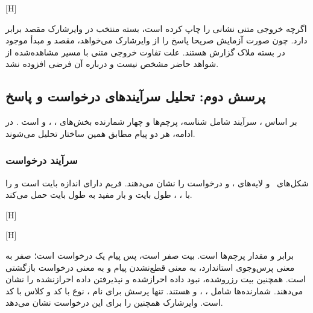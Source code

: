 [H]

اگرچه خروجی متنی  نشانی  را چاپ کرده است، بسته منتخب در وایرشارک
مقصد  برابر  دارد. چون صورت آزمایش صریحا پاسخ را از
وایرشارک می‌خواهد، مقصد و مبدأ موجود در بسته ملاک گزارش هستند. علت تفاوت خروجی متنی با مسیر
مشاهده‌شده از شواهد حاضر مشخص نیست و درباره آن فرضی افزوده نشد.

\subsection{پرسش دوم: تحلیل سرآیندهای درخواست و پاسخ }

بر اساس ، سرآیند  شامل شناسه، پرچم‌ها و چهار شمارنده
بخش‌های ، ،  و  است .
در ادامه، هر دو پیام مطابق همین ساختار تحلیل می‌شوند.

\subsubsection{سرآیند درخواست}

شکل‌های~ و
 لایه‌های ،  و  درخواست را
نشان می‌دهند. فریم  دارای اندازه  بایت است و  را با
، ، طول  بایت و بار مفید  به طول  بایت
حمل می‌کند.

[H]

[H]

 برابر  و مقدار پرچم‌ها  است. بیت  صفر است، پس پیام
یک درخواست است؛  صفر به معنی پرس‌وجوی استاندارد،  به معنی قطع‌نشدن
پیام و  به معنی درخواست بازگشتی است. همچنین 
بیت رزروشده،  نبود داده احرازشده و  نپذیرفتن داده احرازنشده را نشان
می‌دهند. شمارنده‌ها شامل
، ،  و 
هستند. تنها پرسش برای نام ، نوع  با کد  و کلاس 
با کد  است. وایرشارک همچنین  را برای این درخواست نشان
می‌دهد.

